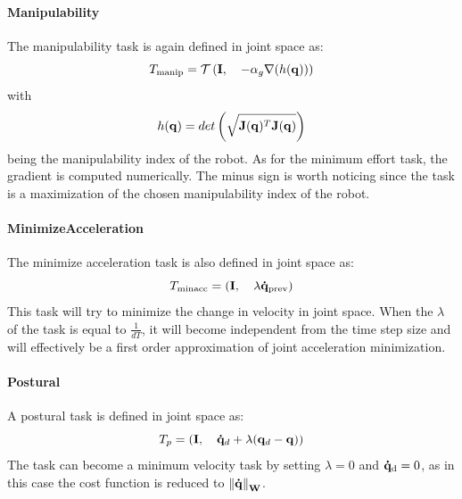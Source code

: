 \paragraph{Manipulability}
The manipulability task is again defined in joint space as:
\begin{equation}
T_\text{manip} = \mathcal{T} \left(\mathbf{I}, \quad -\alpha_g\nabla(h(\mathbf{q}))\right)
\end{equation}
with
\begin{equation}
h(\mathbf{q}) = det\left(\sqrt{\mathbf{J}(\mathbf{q})^T\mathbf{J}(\mathbf{q})}\right)
\end{equation}
being the manipulability index of the robot. As for the minimum effort task, the gradient is computed numerically. The minus sign  is worth noticing since the task is a maximization of the chosen manipulability index of the robot.

\paragraph{MinimizeAcceleration} 
The minimize acceleration task is also defined in joint space as:
\begin{equation}
T_\text{minacc} = \left(\mathbf{I}, \quad \lambda\mathbf{\dot{q}}_\text{prev}\right)
\end{equation}
This task will try to minimize the change in velocity in joint space. When the $\lambda$ of the task is equal to $\frac{1}{dT}$, it will become independent from the time step size and will effectively be a first order approximation of joint acceleration minimization.

\paragraph{Postural}
A postural task is defined in joint space as:
\begin{equation}
T_p = \left(\mathbf{I}, \quad  \mathbf{\dot{q}}_d + \lambda(\mathbf{q}_d - \mathbf{q})\right)
\label{sec:postural_task}
\end{equation}
The task can become a minimum velocity task by setting $\lambda=0$ and $\mathbf{\dot{q}}_\text{d} = 0$, as in this case the cost function is reduced to $\left \| \mathbf{\dot{q}} \right \|_\textbf{W}$.


